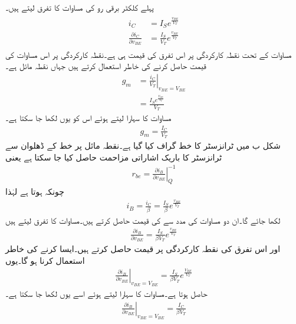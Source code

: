 پہلے کلکٹر  برقی رو کی مساوات کا تفرق لیتے ہیں۔
\begin{gather}
\begin{aligned}
i_C &= I_S e^{\frac{v_{BE}}{V_T}}\\
\frac{\partial i_C}{\partial v_{BE}}&=\frac{I_S}{V_T} e^{\frac{v_{BE}}{V_T}}
\end{aligned}
\end{gather}
مساوات   کے تحت نقطہ کارکردگی پر اس تفرق کی قیمت ہی  ہے۔نقطہ کارکردگی پر اس مساوات کی قیمت حاصل کرنے کی خاطر  استعمال کرتے ہیں جہاں  نقطہ مائل ہے۔
\begin{align*}
g_m &=\left . \frac{i_C}{ V_T} \right |_{v_{BE}=V_{BE}}\\
&=\frac{I_S e^{\frac{V_{BE}}{V_T}}}{V_T} 
\end{align*}
مساوات   کا سہارا لیتے ہوئے اس کو یوں لکھا جا سکتا ہے۔
\begin{align} \label{مساوات_ٹرانزسٹر_رو_سے_موصلیت_نما_کا_حصول}
g_m = \frac{I_C}{V_T}
\end{align}
شکل   ب میں ٹرانزسٹر کا    خط گراف کیا گیا ہے۔نقطہ مائل پر خط کے ڈھلوان سے ٹرانزسٹر کا باریک اشاراتی مزاحمت   حاصل کیا جا سکتا ہے یعنی
\begin{align}
r_{be}= \left .\frac{\partial i_B}{\partial v_{BE}} \right |_Q^{-1}
\end{align}
چونکہ  ہوتا ہے لہٰذا 
\begin{align} \label{مساوات_ٹرانزسٹر_قابو_رو_الف}
i_B =\frac{i_C}{\beta}=\frac{I_S}{\beta} e^{\frac{v_{BE}}{V_T}}
\end{align}
لکھا جائے گا۔ان دو مساوات کی مدد سے   کی قیمت حاصل کرتے ہیں۔مساوات   کا تفرق لیتے ہیں
\begin{align*}
\frac{\partial i_B}{\partial v_{BE}}=\frac{I_S}{\beta V_T} e^{\frac{v_{BE}}{V_T}}
\end{align*}
اور اس تفرق کی نقطہ کارکردگی پر قیمت حاصل کرتے ہیں۔ایسا کرنے کی خاطر   استعمال کرنا ہو گا۔یوں
\begin{align*}
\left . \frac{\partial i_B}{\partial v_{BE}} \right |_{v_{BE}=V_{BE}}=\frac{I_S}{\beta V_T} e^{\frac{V_{BE}}{V_T}}
\end{align*}
حاصل ہوتا ہے۔مساوات   کا سہارا لیتے ہوئے اسے یوں لکھا جا سکتا ہے۔
\begin{align*}
\left . \frac{\partial i_B}{\partial v_{BE}} \right |_{v_{BE}=V_{BE}}=\frac{I_C}{\beta V_T}
\end{align*}
